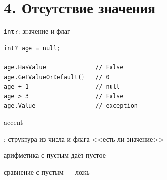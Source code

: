 \documentclass[aspectratio=169,10pt,t]{beamer}
\begin{document}
\begin{frame}[plain]
\end{frame}

\section{4. Отсутствие значения}

\begin{frame}[plain]
\end{frame}

\begin{frame}[fragile]{\texttt{int?}: значение и флаг}
  \slidetop
  \begin{minipage}[t]{0.5\textwidth}
\begin{lstlisting}[style=csharp,basicstyle=\ttfamily\small]
int? age = null;

age.HasValue              // False
age.GetValueOrDefault()   // 0
age + 1                   // null
age > 3                   // False
age.Value                 // exception
\end{lstlisting}
  \end{minipage}\hfill
  \begin{minipage}[t]{0.44\textwidth}
    \vspace{0.2em}
    \begin{cbul}{accent}
      \item {}: структура из числа и флага <<есть ли
            значение>>
      \item арифметика с пустым даёт пустое
      \item сравнение с пустым --- ложь
    \end{cbul}
    \vspace{1.0em}
  \end{minipage}
\end{frame}
\end{document}
